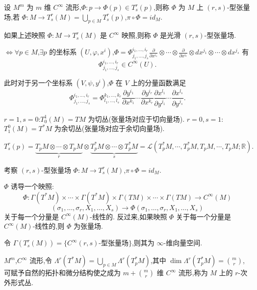 \begin{definition}
设 $M^m$ 为 $m$ 维 $C^\infty$ 流形,$\Phi : p \to \Phi(p) \in T_s^r(p)$,则称 $\Phi$ 为 $M$ 上 $(r,s)$-型张量场,若 $\Phi : M \to T_s^r(M) = \bigcup_{p \in M} T_s^r(p)$,$\pi \circ \Phi = id_M$.
\end{definition}

\begin{definition}
如果上述映照 $\Phi : M \to T_s^r(M)$ 是 $C^\infty$ 映照,则称 $\Phi$ 是光滑 $(r,s)$-型张量场.
\end{definition}

$\Longleftrightarrow \forall p \in M$,$\exists p$ 的坐标系 $(U, \varphi, x^i)$,$\Phi = \Phi^{i_1,\ldots,i_r}_{j_1,\ldots,j_s} \frac{\partial}{\partial x^{i_1}} \otimes \cdots \otimes \frac{\partial}{\partial x^{i_r}} \otimes dx^{j_1} \otimes \cdots \otimes dx^{j_s}$ 有
\[
\Phi^{i_1,\ldots,i_r}_{j_1,\ldots,j_s} \in C^\infty(U).
\]

此时对于另一个坐标系 $(V, \psi, y^i)$,$\Phi$ 在 $V$ 上的分量函数满足
\[
\Phi^{i_1,\ldots,i_r}_{j_1,\ldots,j_s} = \Phi^{k_1,\ldots,k_r}_{l_1,\ldots,l_s} \frac{\partial y^{i_1}}{\partial x^{k_1}} \cdots \frac{\partial y^{i_r}}{\partial x^{k_r}} \frac{\partial x^{l_1}}{\partial y^{j_1}} \cdots \frac{\partial x^{l_s}}{\partial y^{j_s}}.
\]

$r = 1, s = 0$:$T_0^1(M) = TM$ 为切丛(张量场对应于切向量场).
$r = 0, s = 1$:$T_1^0(M) = T^*M$ 为余切丛(张量场对应于余切向量场).

\[
T_s^r(p) = \underbrace{T_pM \otimes \cdots \otimes T_pM}_{r} \otimes \underbrace{T_p^*M \otimes \cdots \otimes T_p^*M}_{s} = \mathcal{L}(T_p^*M, \cdots, T_p^*M, T_pM, \cdots, T_pM; \mathbb{R}).
\]

考察 $(r, s)$-型张量场 $\Phi : M \rightarrow T_s^r(M)$,$\pi \circ \Phi = id_M$.

$\Phi$ 诱导一个映照:
\[
\Phi : \Gamma(T^*M) \times \cdots \times \Gamma(T^*M) \times \Gamma(TM) \times \cdots \times \Gamma(TM) \rightarrow C^\infty(M)
\]
\[
(\sigma_1, \ldots, \sigma_r, X_1, \ldots, X_s) \rightarrow \Phi(\sigma_1, \ldots, \sigma_r, X_1, \ldots, X_s)
\]
关于每一个分量是 $C^\infty(M)$-线性的.
反过来,如果映照 $\Phi$ 关于每一个分量是 $C^\infty(M)$-线性的,则 $\Phi$ 为张量场.

令 $\Gamma(T_s^r(M)) = \{C^\infty (r, s)\text{-型张量场}\}$,则其为 $\infty$-维向量空间.

$M^m$,$C^\infty$ 流形,令 $\Lambda^r(T^*M) = \bigcup_{p \in M} \Lambda^r(T_p^*M)$,其中 $\dim \Lambda^r(T_p^*M) = \binom{m}{r}$,可赋予自然的拓扑和微分结构使之成为 $m + \binom{m}{r}$ 维 $C^\infty$ 流形,称为 $M$ 上的 $r$-次外形式丛.

